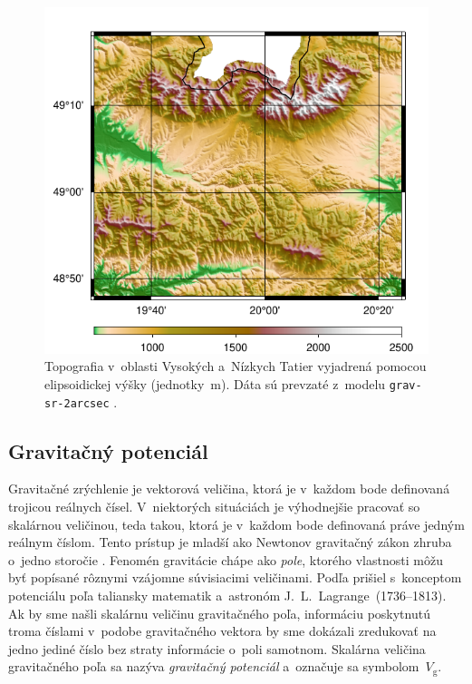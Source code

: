 \documentclass[a4paper, 12pt]{book}
\newcommand{\gidx}{\mathrm g}
\begin{document}
\begin{figure}
\centering
\includegraphics{./fig-h-grav-sr-2arcsec.pdf}
\caption{Topografia v~oblasti Vysokých a~Nízkych Tatier vyjadrená pomocou 
elipsoidickej výšky (jednotky~m).  Dáta sú prevzaté z~modelu 
\texttt{grav-sr-2arcsec} \parencite{GravSR2arcsec}.}
\label{fig:h_grav_sr_2arcsec}
\end{figure}







\subsection{Gravitačný potenciál}
\label{sec:vg}

Gravitačné zrýchlenie je vektorová veličina, ktorá je v~každom bode definovaná 
trojicou reálnych čísel.  V~niektorých situáciách je výhodnejšie pracovať so 
skalárnou veličinou, teda takou, ktorá je v~každom bode definovaná práve jedným 
reálnym číslom.  Tento prístup je mladší ako Newtonov gravitačný zákon zhruba 
o~jedno storočie \parencite{MacMillan1930,Jekeli2015}.  Fenomén gravitácie 
chápe ako \emph{pole}, ktorého vlastnosti môžu byť popísané rôznymi vzájomne 
súvisiacimi veličinami.  Podľa \textcite{MacMillan1930} prišiel s~konceptom 
potenciálu poľa taliansky matematik a~astronóm J.~L.~Lagrange~(1736--1813).  Ak 
by sme našli skalárnu veličinu gravitačného poľa, informáciu poskytnutú troma 
číslami v~podobe gravitačného vektora by sme dokázali zredukovať na jedno 
jediné číslo bez straty informácie o~poli samotnom.  Skalárna veličina 
gravitačného poľa sa nazýva \emph{gravitačný potenciál} a~označuje sa 
symbolom~$V_\gidx$.
\end{document}
